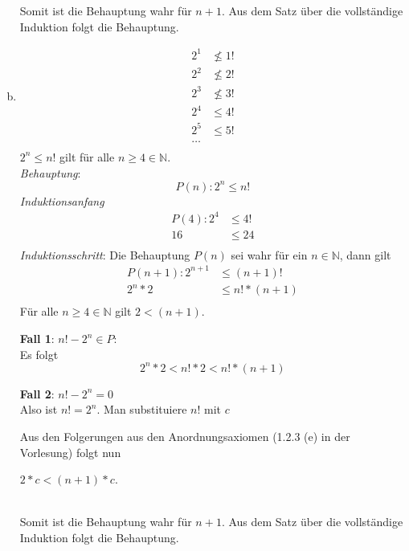 \documentclass{article}
\begin{document}
\begin{enumerate}[a)]
  Somit ist die Behauptung wahr für $n + 1$.
  Aus dem Satz über die vollständige Induktion folgt die Behauptung.
  
\item
  \begin{align*}
    2^1 &\nleq 1! \\
    2^2 &\nleq 2! \\
    2^3 &\nleq 3! \\
    2^4 &\leq 4! \\
    2^5 &\leq 5! \\
    \ldots \\
  \end{align*}
  $2^n \leq n!$ gilt für alle $n \geq 4 \in \mathbb{N}$. \\
  \emph{Behauptung}:
  \[
    P(n) \colon 2^n \leq n! 
  \]
  \emph{Induktionsanfang}
  \begin{align*}
    P(4) \colon 2^4 &\leq 4! \\
                 16 &\leq 24 \\
  \end{align*}
  \emph{Induktionsschritt}: Die Behauptung $P(n)$ sei wahr für ein $n \in \mathbb{N}$,
  dann gilt \\
  \begin{align*}
    P(n + 1) \colon 2^{n + 1} &\leq (n + 1)! \\
                      2^n * 2 &\leq n! * (n + 1) \\
  \end{align*}
  Für alle $n \geq 4 \in \mathbb{N}$ gilt $2 < (n + 1)$. \\
  
  \begin{minipage}[t]{.45\textwidth}
    \textbf{Fall 1}: $n! - 2^n \in P$: \\
    
    Es folgt
    \[
      2^n * 2 < n! * 2 < n! * (n + 1)
    \]
  \end{minipage}
  \hfill
  \vrule
  \hfill
  \begin{minipage}[t]{.45\textwidth}
    \textbf{Fall 2}: $n! - 2^n = 0$ \\

    Also ist $n! = 2^n$. Man substituiere $n!$ mit $c$
    
    Aus den Folgerungen aus den Anordnungsaxiomen (1.2.3 (e) in der Vorlesung) folgt nun
    
    $2 * c < (n + 1) * c$.
  \end{minipage} \\
  Somit ist die Behauptung wahr für $n + 1$.
  Aus dem Satz über die vollständige Induktion folgt die Behauptung.


\end{enumerate}
\end{document}
